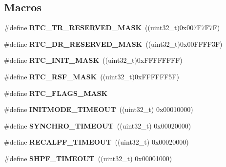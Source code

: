 \subsection*{Macros}
\begin{DoxyCompactItemize}
\item 
\hypertarget{group___r_t_c_gacc08d7d212e235f4b04bb88f5567fa54}{\#define {\bfseries R\-T\-C\-\_\-\-T\-R\-\_\-\-R\-E\-S\-E\-R\-V\-E\-D\-\_\-\-M\-A\-S\-K}~((uint32\-\_\-t)0x007\-F7\-F7\-F)}\label{group___r_t_c_gacc08d7d212e235f4b04bb88f5567fa54}

\item 
\hypertarget{group___r_t_c_ga16855eaae542f992c93170492822d058}{\#define {\bfseries R\-T\-C\-\_\-\-D\-R\-\_\-\-R\-E\-S\-E\-R\-V\-E\-D\-\_\-\-M\-A\-S\-K}~((uint32\-\_\-t)0x00\-F\-F\-F\-F3\-F)}\label{group___r_t_c_ga16855eaae542f992c93170492822d058}

\item 
\hypertarget{group___r_t_c_ga0dbaf639bc171f2055c9055d538f13df}{\#define {\bfseries R\-T\-C\-\_\-\-I\-N\-I\-T\-\_\-\-M\-A\-S\-K}~((uint32\-\_\-t)0x\-F\-F\-F\-F\-F\-F\-F\-F)}\label{group___r_t_c_ga0dbaf639bc171f2055c9055d538f13df}

\item 
\hypertarget{group___r_t_c_ga3a1033490aaf8304e1522d551bd1a7b9}{\#define {\bfseries R\-T\-C\-\_\-\-R\-S\-F\-\_\-\-M\-A\-S\-K}~((uint32\-\_\-t)0x\-F\-F\-F\-F\-F\-F5\-F)}\label{group___r_t_c_ga3a1033490aaf8304e1522d551bd1a7b9}

\item 
\#define {\bfseries R\-T\-C\-\_\-\-F\-L\-A\-G\-S\-\_\-\-M\-A\-S\-K}
\item 
\hypertarget{group___r_t_c_gab89243e1f23e45fedc6357396b26827d}{\#define {\bfseries I\-N\-I\-T\-M\-O\-D\-E\-\_\-\-T\-I\-M\-E\-O\-U\-T}~((uint32\-\_\-t) 0x00010000)}\label{group___r_t_c_gab89243e1f23e45fedc6357396b26827d}

\item 
\hypertarget{group___r_t_c_ga017f8fc40e791545ae1dfebf84567ed8}{\#define {\bfseries S\-Y\-N\-C\-H\-R\-O\-\_\-\-T\-I\-M\-E\-O\-U\-T}~((uint32\-\_\-t) 0x00020000)}\label{group___r_t_c_ga017f8fc40e791545ae1dfebf84567ed8}

\item 
\hypertarget{group___r_t_c_gae578d94ca54a697f9d26b20944f036bc}{\#define {\bfseries R\-E\-C\-A\-L\-P\-F\-\_\-\-T\-I\-M\-E\-O\-U\-T}~((uint32\-\_\-t) 0x00020000)}\label{group___r_t_c_gae578d94ca54a697f9d26b20944f036bc}

\item 
\hypertarget{group___r_t_c_ga911218ae83f22129a4df0087d98db3cd}{\#define {\bfseries S\-H\-P\-F\-\_\-\-T\-I\-M\-E\-O\-U\-T}~((uint32\-\_\-t) 0x00001000)}\label{group___r_t_c_ga911218ae83f22129a4df0087d98db3cd}

\end{DoxyCompactItemize}
